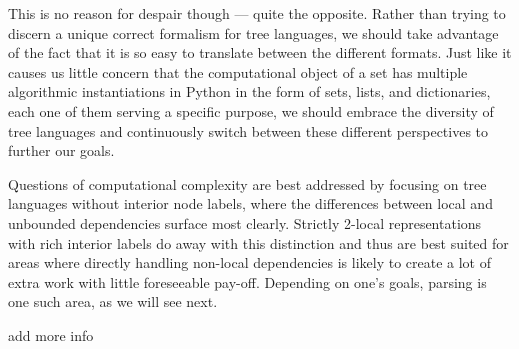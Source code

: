 This is no reason for despair though --- quite the opposite.
Rather than trying to discern a unique correct formalism for tree languages, we should take advantage of the fact that it is so easy to translate between the different formats.
Just like it causes us little concern that the computational object of a set has multiple algorithmic instantiations in Python in the form of sets, lists, and dictionaries, each one of them serving a specific purpose, we should embrace the diversity of tree languages and continuously switch between these different perspectives to further our goals.

Questions of computational complexity are best addressed by focusing on tree languages without interior node labels, where the differences between local and unbounded dependencies surface most clearly.
Strictly 2-local representations with rich interior labels do away with this distinction and thus are best suited for areas where directly handling non-local dependencies is likely to create a lot of extra work with little foreseeable pay-off.
Depending on one's goals, parsing is one such area, as we will see next.

\begin{literature}
add more info
\end{literature}
